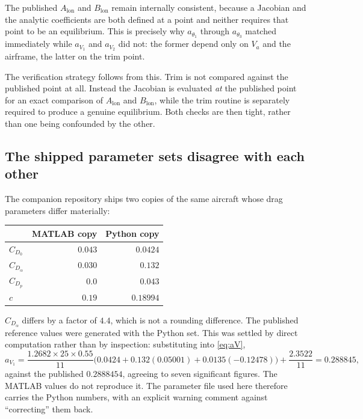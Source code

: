 \documentclass[11pt,a4paper]{article}
\newcommand{\lon}{\mathrm{lon}}
\begin{document}
The published $A_\lon$ and $B_\lon$ remain internally consistent, because a
Jacobian and the analytic coefficients are both defined at a point and neither
requires that point to be an equilibrium. This is precisely why
$a_{\theta_1}$ through $a_{\theta_3}$ matched immediately while $a_{V_1}$ and
$a_{V_2}$ did not: the former depend only on $V_a$ and the airframe, the latter on
the trim point.

The verification strategy follows from this. Trim is not compared against the
published point at all. Instead the Jacobian is evaluated \emph{at} the published
point for an exact comparison of $A_\lon$ and $B_\lon$, while the trim routine is
separately required to produce a genuine equilibrium. Both checks are then tight,
rather than one being confounded by the other.

\subsection{The shipped parameter sets disagree with each other}

The companion repository ships two copies of the same aircraft whose drag
parameters differ materially:

\begin{center}
\begin{tabular}{lrr}
\toprule
 & MATLAB copy & Python copy \\
\midrule
$C_{D_0}$ & $0.043$ & $0.0424$ \\
$C_{D_\alpha}$ & $0.030$ & $\mathbf{0.132}$ \\
$C_{D_p}$ & $0.0$ & $0.043$ \\
$c$ & $0.19$ & $0.18994$ \\
\bottomrule
\end{tabular}
\end{center}

$C_{D_\alpha}$ differs by a factor of $4.4$, which is not a rounding difference.
The published reference values were generated with the Python set. This was
settled by direct computation rather than by inspection: substituting into
\eqref{eq:aV},
\begin{equation}
  a_{V_1} = \frac{1.2682 \times 25 \times 0.55}{11}
            \bigl(0.0424 + 0.132(0.05001) + 0.0135(-0.12478)\bigr)
            + \frac{2.3522}{11} = 0.288845,
  \label{eq:aV1check}
\end{equation}
against the published $0.2888454$, agreeing to seven significant figures. The
MATLAB values do not reproduce it. The parameter file used here therefore carries
the Python numbers, with an explicit warning comment against ``correcting'' them
back.
\end{document}
